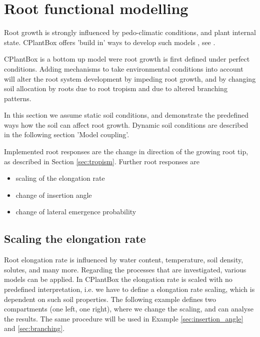 \newpage
\section{Root functional modelling} \label{sec:functional}

Root growth is strongly influenced by pedo-climatic conditions, and plant internal state. CPlantBox offers 'build in' ways to develop such models , see \cite{schnepf2018crootbox}. 

CPlantBox is a bottom up model were root growth is first defined under perfect conditions. Adding mechanisms to take environmental conditions into account will alter the root system development by impeding root growth, and by changing soil allocation by roots due to root tropism and due to altered branching patterns.

In this section we assume static soil conditions, and demonstrate the predefined ways how the soil can affect root growth.
Dynamic soil conditions are described in the following section 'Model coupling'. 

Implemented root responses are the change in direction of the growing root tip, as described in Section \ref{sec:tropism}.
Further root responses are 
\begin{itemize}
 \item scaling of the elongation rate 
 \item change of insertion angle
 \item change of lateral emergence probability
\end{itemize}

\subsection{Scaling the elongation rate} \label{sec:elongation}

Root elongation rate is influenced by water content, temperature, soil density, solutes, and many more. Regarding the processes that are investigated, various models can be applied. In CPlantBox the elongation rate is scaled with no predefined interpretation, i.e. we have to define a elongation rate scaling, which is dependent on such soil properties. The following example defines two compartments (one left, one right), where we change the scaling, and can analyse the results. The same procedure will be used in Example \ref{sec:insertion_angle} and \ref{sec:branching}.



